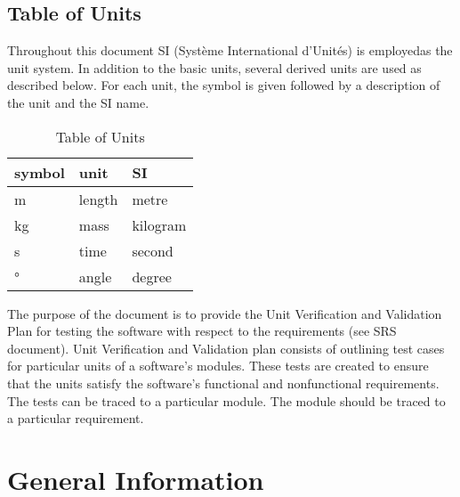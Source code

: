 \documentclass[12pt, titlepage]{article}
\begin{document}
\subsection{Table of Units}

Throughout this document SI (Syst\`{e}me International d'Unit\'{e}s) is
employedas the unit system. In addition to the basic units, several derived
units are
used as described below.  For each unit, the symbol is given followed by a
description of the unit and the SI name.\\

\renewcommand{\arraystretch}{1.2}
\begin{table}[h!]
	\centering
\begin{center}
  \noindent \begin{tabular}{l l l} 
    \toprule		
    \textbf{symbol} & \textbf{unit} & \textbf{SI}\\
    \midrule 
    \si{\metre} & length & metre\\
    \si{\kilogram} & mass & kilogram\\
    \si{\second} & time & second\\
    \si{\degree} & angle & degree\\
    \bottomrule
  \end{tabular}
\end{center}
	\caption{Table of Units}
	\label{Table:R_trace}
\end{table}

\newpage

\tableofcontents

\listoftables


\newpage


The purpose of the document is to provide the Unit Verification and Validation Plan for testing the \progname{}software with 
respect to the requirements (see SRS document). Unit Verification and 
Validation plan consists of outlining test cases for particular units of a 
software's modules. These tests are created to ensure that the units satisfy 
the software's functional and nonfunctional requirements. The tests can be 
traced to a particular module. The module should be traced to a particular 
requirement. 

\section{General Information}
\end{document}
